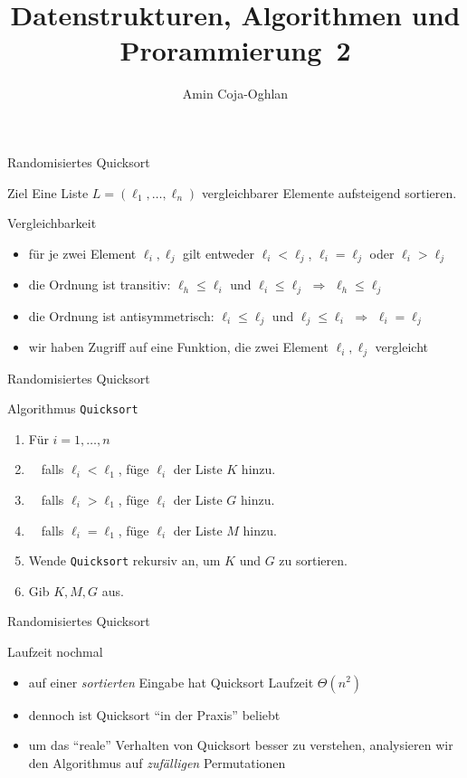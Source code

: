\documentclass[aspectratio=1610, 11pt]{beamer}
\title{Datenstrukturen, Algorithmen und Prorammierung~2}
\author[A.~Coja-Oghlan]{Amin Coja-Oghlan}
\institute[DAP2]{Lehrstuhl Informatik 2\\Fakult\"at f\"ur Informatik}
\begin{document}
\maketitle

\begin{frame}{Randomisiertes Quicksort}
	\begin{block}{Ziel}
			Eine Liste $L=(\ell_1,\ldots,\ell_n)$ \alert{vergleichbarer} Elemente aufsteigend sortieren.
	\end{block}
\begin{exampleblock}{Vergleichbarkeit}
	\begin{itemize}
		\item f\"ur je zwei Element $\ell_i,\ell_j$ gilt entweder $\ell_i<\ell_j$, $\ell_i=\ell_j$ oder $\ell_i>\ell_j$
		\item die Ordnung ist \alert{transitiv}: $\ell_h\leq\ell_i$ und $\ell_i\leq\ell_j$ $\Rightarrow$ $\ell_h\leq\ell_j$
	\item die Ordnung ist \alert{antisymmetrisch}: $\ell_i\leq\ell_j$ und $\ell_j\leq\ell_i$ $\Rightarrow$ $\ell_i=\ell_j$
	\item wir haben Zugriff auf eine Funktion, die zwei Element $\ell_i,\ell_j$ vergleicht
	\end{itemize}
	\end{exampleblock}
\end{frame}

\begin{frame}{Randomisiertes Quicksort}
\begin{exampleblock}{Algorithmus \tt Quicksort}
	\begin{enumerate}
		\item F\"ur $i=1,\ldots,n$
		\item $\quad$falls $\ell_i<\ell_1$, f\"uge $\ell_i$ der Liste $K$ hinzu.
		\item $\quad$falls $\ell_i>\ell_1$, f\"uge $\ell_i$ der Liste $G$ hinzu.
		\item $\quad$falls $\ell_i=\ell_1$, f\"uge $\ell_i$ der Liste $M$ hinzu.
		\item Wende {\tt Quicksort} rekursiv an, um $K$ und $G$ zu sortieren.
		\item Gib $K,M,G$ aus.
	\end{enumerate}
	\end{exampleblock}
\end{frame}

\begin{frame}{Randomisiertes Quicksort}
\begin{exampleblock}{Laufzeit nochmal}
	\begin{itemize}
		\item auf einer \emph{sortierten} Eingabe hat Quicksort Laufzeit $\Theta(n^2)$
		\item dennoch ist Quicksort ``in der Praxis'' beliebt
		\item um das ``reale'' Verhalten von Quicksort besser zu verstehen, analysieren wir den Algorithmus auf \emph{zuf\"alligen} Permutationen
	\end{itemize}
	\end{exampleblock}
\end{frame}
\end{document}
